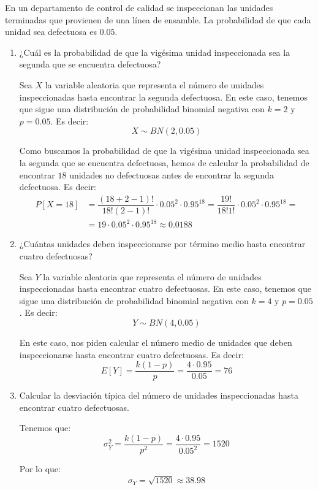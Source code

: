 \begin{ejercicio}
    En un departamento de control de calidad se inspeccionan las unidades terminadas que provienen
    de una línea de ensamble. La probabilidad de que cada unidad sea defectuosa es $0.05$.
    \begin{enumerate}
        \item ¿Cuál es la probabilidad de que la vigésima unidad inspeccionada sea la segunda que se encuentra defectuosa?
        
        Sea $X$ la variable aleatoria que representa el número de unidades inspeccionadas hasta encontrar la segunda defectuosa. En este caso, tenemos que sigue una distribución de probabilidad binomial negativa con $k=2$ y $p=0.05$. Es decir:
        \begin{equation*}
            X \sim BN(2,0.05)
        \end{equation*}

        Como buscamos la probabilidad de que la vigésima unidad inspeccionada sea la segunda que se encuentra defectuosa, hemos de calcular la probabilidad de
        encontrar $18$ unidades no defectuosas antes de encontrar la segunda defectuosa. Es decir:
        \begin{align*}
            P[X=18] &= \dfrac{(18+2-1)!}{18!(2-1)!} \cdot 0.05^2 \cdot 0.95^{18} = \dfrac{19!}{18!1!} \cdot 0.05^2 \cdot 0.95^{18} =\\
            &= 19 \cdot 0.05^2 \cdot 0.95^{18} \approx 0.0188
        \end{align*}
        \item ¿Cuántas unidades deben inspeccionarse por término medio hasta encontrar cuatro defectuosas?
        
        Sea $Y$ la variable aleatoria que representa el número de unidades inspeccionadas hasta encontrar cuatro defectuosas. En este caso, tenemos que sigue una distribución de probabilidad binomial negativa con $k=4$ y $p=0.05$. Es decir:
        \begin{equation*}
            Y \sim BN(4,0.05)
        \end{equation*}

        En este caso, nos piden calcular el número medio de unidades que deben inspeccionarse hasta encontrar cuatro defectuosas. Es decir:
        \begin{equation*}
            E[Y] = \dfrac{k(1-p)}{p} = \dfrac{4\cdot 0.95}{0.05} = 76
        \end{equation*}
        \item Calcular la desviación típica del número de unidades inspeccionadas hasta encontrar cuatro
        defectuosas.

        Tenemos que:
        \begin{equation*}
            \sigma_Y^2 = \dfrac{k(1-p)}{p^2} = \dfrac{4\cdot 0.95}{0.05^2} = 1520
        \end{equation*}

        Por lo que:
        \begin{equation*}
            \sigma_Y = \sqrt{1520} \approx 38.98
        \end{equation*}
    \end{enumerate}
\end{ejercicio}

